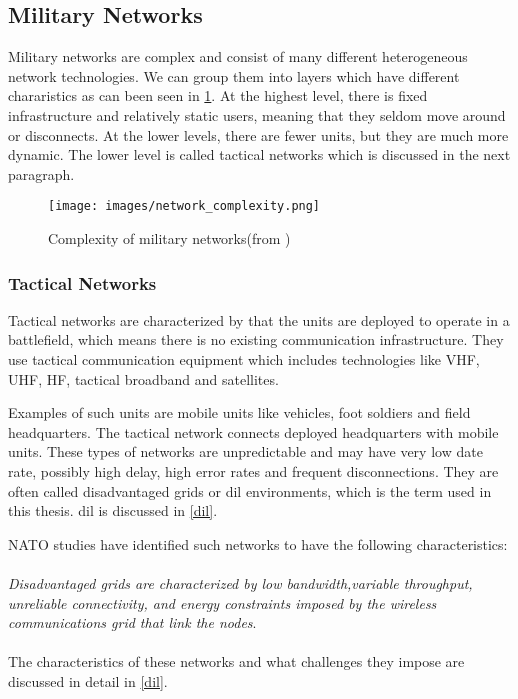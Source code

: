 \subsection{Military Networks}

Military networks are complex and consist of many different heterogeneous
network technologies. We can group them into layers which have different
chararistics as can been seen in \cref{figure:military-networks}. At the highest
level, there is fixed infrastructure and relatively static users, meaning that
they seldom move around or disconnects. At the lower levels, there are fewer
units, but they are much more dynamic. The lower level is called tactical
networks which is discussed in the next paragraph.

\begin{figure}[h]
\texttt{[image: images/network\_complexity.png]}
\caption{Complexity of military networks(from \cite{pervasive-web})}
\label{figure:military-networks}
\end{figure}


\subsubsection{Tactical Networks}
Tactical networks are characterized by that the units are deployed to operate in
a battlefield, which means there is no existing communication infrastructure.
They use tactical communication equipment which includes technologies like VHF,
UHF, HF, tactical broadband and satellites\cite{ist-090}.

Examples of such units are mobile units like vehicles, foot soldiers and field
headquarters. The tactical network connects deployed headquarters with mobile
units. These types of networks are unpredictable and may have very low date
rate, possibly high delay, high error rates and frequent disconnections. They
are often called disadvantaged grids or \gls{dil} environments, which is the term used in
this thesis. \gls{dil} is discussed in \cref{dil}.

NATO studies\cite{nato-disadvantaged-grids} have identified such networks to
have the following characteristics:
\\\\
\textit{
Disadvantaged grids are characterized by low bandwidth,variable throughput,
unreliable connectivity, and energy constraints imposed by the wireless
communications grid that link the nodes}.
\paragraph{}
The characteristics of these networks and what challenges they impose are
discussed in detail in \cref{dil}.




